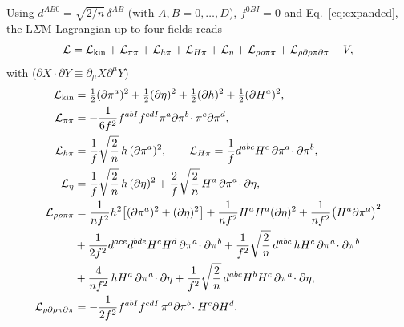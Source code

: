 \documentclass[aps,prd,twocolumn,superscriptaddress,nofootinbib,floatfix]{revtex4-2}
\theoremstyle{remark}
\begin{document}
\begin{widetext}
Using $d^{AB0}=\sqrt{2/n}\,\delta^{AB}$ (with $A,B=0,\dots,D$), $f^{0BI}=0$ and Eq.~\eqref{eq:expanded}, the L$\Sigma$M Lagrangian up to four fields reads
\begin{equation}
\mathcal{L}=\mathcal{L}_{\rm kin}+\mathcal{L}_{\pi\pi}+\mathcal{L}_{h\pi}+\mathcal{L}_{H\pi}+\mathcal{L}_{\eta}+\mathcal{L}_{\rho\rho\pi\pi}+\mathcal{L}_{\rho\partial\rho\pi\partial\pi}-V ,
\end{equation}
with ($\partial X\!\cdot\partial Y\equiv\partial_\mu X\partial^\mu Y$)
\begin{align}
\mathcal{L}_{\rm kin}&=\tfrac12(\partial\pi^a)^2+\tfrac12(\partial\eta)^2+\tfrac12(\partial h)^2+\tfrac12(\partial H^a)^2,\nonumber\\
\mathcal{L}_{\pi\pi}&=-\frac{1}{6f^2}f^{abI}f^{cdI}\pi^a\partial\pi^b\!\cdot\pi^c\partial\pi^d,\nonumber\\
\mathcal{L}_{h\pi}&=\frac1f\sqrt{\frac2n}\,h\,(\partial\pi^a)^2,\qquad
\mathcal{L}_{H\pi}=\frac1f d^{abc}H^c\,\partial\pi^a\!\cdot\partial\pi^b,\nonumber\\
\mathcal{L}_{\eta}&=\frac1f\sqrt{\frac2n}\,h\,(\partial\eta)^2+\frac2f\sqrt{\frac2n}\,H^a\,\partial\pi^a\!\cdot\partial\eta,\nonumber\\
\mathcal{L}_{\rho\rho\pi\pi}&=\frac{1}{nf^2}h^2\big[(\partial\pi^a)^2+(\partial\eta)^2\big]+\frac{1}{nf^2}H^aH^a(\partial\eta)^2+\frac{1}{nf^2}\big(H^a\partial\pi^a\big)^2\nonumber\\
&+\frac{1}{2f^2}d^{ace}d^{bde}H^cH^d\,\partial\pi^a\!\cdot\partial\pi^b+\frac{1}{f^2}\sqrt{\frac2n}\,d^{abc}\,hH^c\,\partial\pi^a\!\cdot\partial\pi^b\nonumber\\
&+\frac{4}{nf^2}\,hH^a\,\partial\pi^a\!\cdot\partial\eta+\frac{1}{f^2}\sqrt{\frac2n}\,d^{abc}H^bH^c\,\partial\pi^a\!\cdot\partial\eta,\nonumber\\
\mathcal{L}_{\rho\partial\rho\pi\partial\pi}&=-\frac{1}{2f^2}f^{abI}f^{cdI}\,\pi^a\partial\pi^b\!\cdot H^c\partial H^d .
\label{eq:appL}
\end{align}
\end{widetext}

\end{document}
